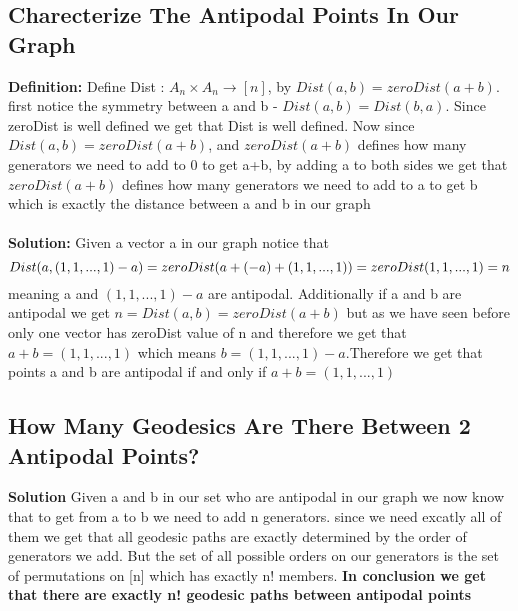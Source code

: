 \documentclass{article}
\begin{document}
\subsection{Charecterize The Antipodal Points In Our Graph}
\textbf{Definition:}
Define Dist : $A_n\times A_n\rightarrow[n]$, by $Dist(a,b) = zeroDist(a+b)$. first notice the symmetry between a and b - $Dist(a,b)=Dist(b,a)$. Since zeroDist is well defined we get that Dist is well defined. Now since $Dist(a,b) = zeroDist(a+b)$, and $zeroDist(a+b)$ defines how many generators we need to add to 0 to get a+b, by adding a to both sides we get that $zeroDist(a+b)$ defines how many generators we need to add to a to get b which is exactly the distance between a and b in our graph
\\
\\
\textbf{Solution:}
Given a vector a in our graph notice that
\[Dist(a,(1,1,...,1)-a)=\\zeroDist(a+(-a)+(1,1,...,1))=zeroDist(1,1,...,1)=n\] meaning a and $(1,1,...,1)-a$ are antipodal. Additionally if a and b are antipodal we get $n=Dist(a,b)=zeroDist(a+b)$ but as we have seen before only one vector has zeroDist value of n and therefore we get that $a+b=(1,1,...,1)$ which means $b=(1,1,...,1)-a$.Therefore we get that points a and b are antipodal if and only if $a+b=(1,1,...,1)$  
\subsection{How Many Geodesics Are There Between 2 Antipodal Points?}
\textbf{Solution}
Given a and b in our set who are antipodal in our graph we now know that to get from a to b we need to add n generators. since we need excatly all of them we get that all geodesic paths are exactly determined by the order of generators we add. But the set of all possible orders on our generators is the set of permutations on [n] which has exactly n! members.
\textbf{In conclusion we get that there are exactly n! geodesic paths between antipodal points}
\end{document}

